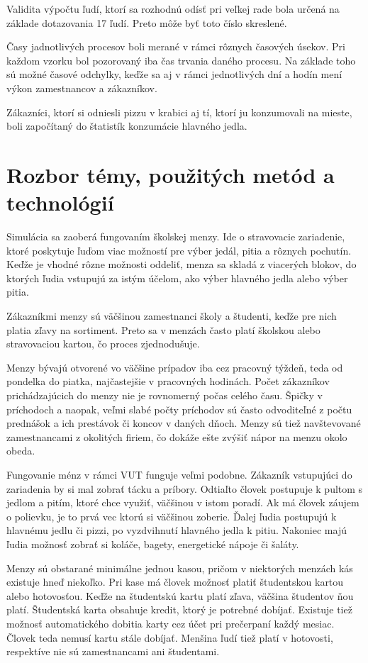 \documentclass{article}
\begin{document}
Validita výpočtu ľudí, ktorí sa rozhodnú odísť pri veľkej rade bola určená na základe dotazovania 17 ľudí. Preto môže byť toto číslo skreslené.

Časy jadnotlivých procesov boli merané v rámci rôznych časových úsekov. Pri každom vzorku bol pozorovaný iba čas trvania daného procesu. Na základe toho sú možné časové odchylky, keďže sa aj v rámci jednotlivých dní a hodín mení výkon zamestnancov a zákazníkov.

Zákazníci, ktorí si odniesli pizzu v krabici aj tí, ktorí ju konzumovali na mieste, boli započítaný do štatistík konzumácie hlavného jedla.

\section{Rozbor témy, použitých metód a technológií}
Simulácia sa zaoberá fungovaním školskej menzy. Ide o stravovacie zariadenie, ktoré poskytuje ľuďom viac možností pre výber jedál, pitia a rôznych pochutín. Keďže je vhodné rôzne možnosti oddeliť, menza sa skladá z viacerých blokov, do ktorých ľudia vstupujú za istým účelom, ako výber hlavného jedla alebo výber pitia.

Zákazníkmi menzy sú väčšinou zamestnanci školy a študenti, keďže pre nich platia zľavy na sortiment. Preto sa v menzách často platí školskou alebo stravovaciou kartou, čo proces zjednodušuje.

Menzy bývajú otvorené vo väčšine prípadov iba cez pracovný týždeň, teda od pondelka do piatka, najčastejšie v pracovných hodinách. Počet zákazníkov prichádzajúcich do menzy nie je rovnomerný počas celého času. Špičky v príchodoch a naopak, veľmi slabé počty príchodov sú často odvoditeľné z počtu prednášok a ich prestávok či koncov v daných dňoch. Menzy sú tiež navštevované zamestnancami z okolitých firiem, čo dokáže ešte zvýšiť nápor na menzu okolo obeda.

Fungovanie ménz v rámci VUT funguje veľmi podobne. Zákazník vstupujúci do zariadenia by si mal zobrať tácku a príbory. Odtiaľto človek postupuje k pultom s jedlom a pitím, ktoré chce využiť, väčšinou v istom poradí. Ak má človek záujem o polievku, je to prvá vec ktorú si väčšinou zoberie. Ďalej ľudia postupujú k hlavnému jedlu či pizzi, po vyzdvihnutí hlavného jedla k pitiu. Nakoniec majú ľudia možnosť zobrať si koláče, bagety, energetické nápoje či šaláty.

Menzy sú obstarané minimálne jednou kasou, pričom v niektorých menzách kás existuje hneď niekoľko. Pri kase má človek možnosť platiť študentskou kartou alebo hotovosťou. Keďže na študentskú kartu platí zľava, väčšina študentov ňou platí. Študentská karta obsahuje kredit, ktorý je potrebné dobíjať. Existuje tiež možnosť automatického dobitia karty cez účet pri prečerpaní každý mesiac. Človek teda nemusí kartu stále dobíjať. Menšina ľudí tiež platí v hotovosti, respektíve nie sú zamestnancami ani študentami.
\end{document}

